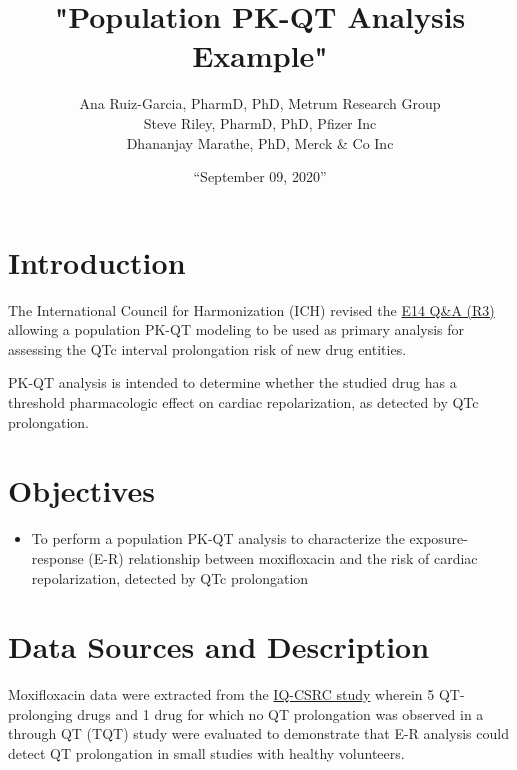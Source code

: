 \documentclass[
]{article}
\title{\vspace{8cm}\LARGE"Population PK-QT Analysis Example"\vspace{4cm}}
\author{Ana Ruiz-Garcia, PharmD, PhD, Metrum Research Group\\
Steve Riley, PharmD, PhD, Pfizer Inc\\
Dhananjay Marathe, PhD, Merck \& Co Inc}
\date{``September 09, 2020''}
\providecommand{\tightlist}{%
  \setlength{\itemsep}{0pt}\setlength{\parskip}{0pt}}
\begin{document}
\maketitle

\centering

\raggedright

\clearpage

\tableofcontents

\newpage

\hypertarget{introduction}{%
\section{Introduction}\label{introduction}}

The International Council for Harmonization (ICH) revised the
\href{https://database.ich.org/sites/default/files/E14_Q\%26As_R3_Q\%26As.pdf}{E14
Q\&A (R3)} allowing a population PK-QT modeling to be used as primary
analysis for assessing the QTc interval prolongation risk of new drug
entities.

PK-QT analysis is intended to determine whether the studied drug has a
threshold pharmacologic effect on cardiac repolarization, as detected by
QTc prolongation.

\hypertarget{objectives}{%
\section{Objectives}\label{objectives}}

\begin{itemize}
\tightlist
\item
  To perform a population PK-QT analysis to characterize the
  exposure-response (E-R) relationship between moxifloxacin and the risk
  of cardiac repolarization, detected by QTc prolongation
\end{itemize}

\hypertarget{data-sources-and-description}{%
\section{Data Sources and
Description}\label{data-sources-and-description}}

Moxifloxacin data were extracted from the
\href{https://pubmed.ncbi.nlm.nih.gov/25670536/}{IQ-CSRC study} wherein
5 QT-prolonging drugs and 1 drug for which no QT prolongation was
observed in a through QT (TQT) study were evaluated to demonstrate that
E-R analysis could detect QT prolongation in small studies with healthy
volunteers.
\end{document}
